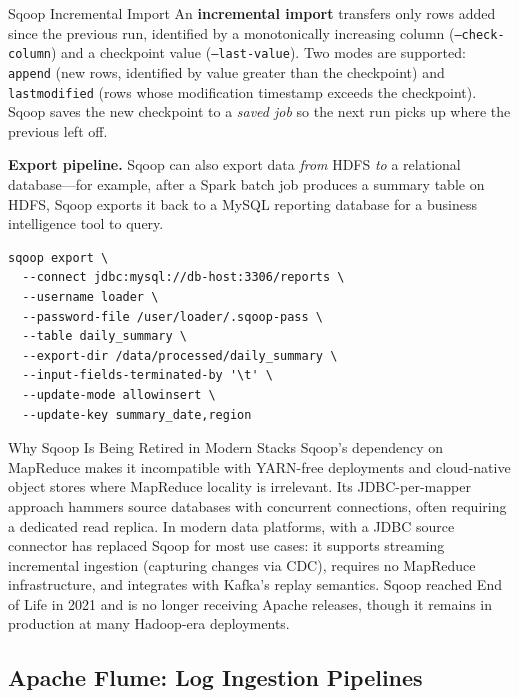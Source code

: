 \begin{defbox}{Sqoop Incremental Import}
An \textbf{incremental import} transfers only rows added since the previous
run, identified by a monotonically increasing column (\texttt{--check-column})
and a checkpoint value (\texttt{--last-value}). Two modes are supported:
\texttt{append} (new rows, identified by value greater than the checkpoint)
and \texttt{lastmodified} (rows whose modification timestamp exceeds the
checkpoint). Sqoop saves the new checkpoint to a \emph{saved job} so the
next run picks up where the previous left off.
\end{defbox}

\textbf{Export pipeline.} Sqoop can also export data \emph{from} HDFS
\emph{to} a relational database---for example, after a Spark batch job
produces a summary table on HDFS, Sqoop exports it back to a MySQL
reporting database for a business intelligence tool to query.

\begin{lstlisting}[style=shell, caption={Sqoop: export from HDFS to MySQL}]
sqoop export \
  --connect jdbc:mysql://db-host:3306/reports \
  --username loader \
  --password-file /user/loader/.sqoop-pass \
  --table daily_summary \
  --export-dir /data/processed/daily_summary \
  --input-fields-terminated-by '\t' \
  --update-mode allowinsert \
  --update-key summary_date,region
\end{lstlisting}

\begin{techdebt}{Why Sqoop Is Being Retired in Modern Stacks}
Sqoop's dependency on MapReduce makes it incompatible with YARN-free
deployments and cloud-native object stores where MapReduce locality
is irrelevant. Its JDBC-per-mapper approach hammers source databases
with concurrent connections, often requiring a dedicated read replica.
In modern data platforms,  with a JDBC source
connector has replaced Sqoop for most use cases: it supports
streaming incremental ingestion (capturing changes via CDC), requires no
MapReduce infrastructure, and integrates with Kafka's replay semantics.
Sqoop reached End of Life in 2021 and is no longer receiving Apache
releases, though it remains in production at many Hadoop-era deployments.
\end{techdebt}

\subsection{Apache Flume: Log Ingestion Pipelines}
\label{subsec:flume}


